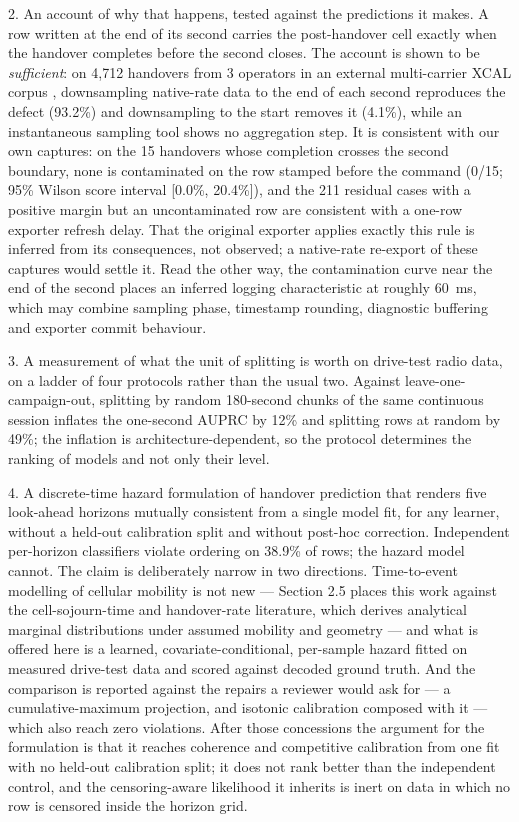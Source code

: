 2. An account of why that happens, tested against the predictions it makes. A row written at the end of its second carries the post-handover cell exactly when the handover completes before the second closes. The account is shown to be \emph{sufficient}: on 4,712 handovers from 3 operators in an external multi-carrier XCAL corpus \cite{ref40}, downsampling native-rate data to the end of each second reproduces the defect (93.2\%) and downsampling to the start removes it (4.1\%), while an instantaneous sampling tool \cite{ref37} shows no aggregation step. It is consistent with our own captures: on the 15 handovers whose completion crosses the second boundary, none is contaminated on the row stamped before the command (0/15; 95\% Wilson score interval [0.0\%, 20.4\%]), and the 211 residual cases with a positive margin but an uncontaminated row are consistent with a one-row exporter refresh delay. That the original exporter applies exactly this rule is inferred from its consequences, not observed; a native-rate re-export of these captures would settle it. Read the other way, the contamination curve near the end of the second places an inferred logging characteristic at roughly 60~ms, which may combine sampling phase, timestamp rounding, diagnostic buffering and exporter commit behaviour.

3. A measurement of what the unit of splitting is worth on drive-test radio data, on a ladder of four protocols rather than the usual two. Against leave-one-campaign-out, splitting by random 180-second chunks of the same continuous session inflates the one-second AUPRC by 12\% and splitting rows at random by 49\%; the inflation is architecture-dependent, so the protocol determines the ranking of models and not only their level.

4. A discrete-time hazard formulation of handover prediction that renders five look-ahead horizons mutually consistent from a single model fit, for any learner, without a held-out calibration split and without post-hoc correction. Independent per-horizon classifiers violate ordering on 38.9\% of rows; the hazard model cannot. The claim is deliberately narrow in two directions. Time-to-event modelling of cellular mobility is not new --- Section 2.5 places this work against the cell-sojourn-time and handover-rate literature, which derives analytical marginal distributions under assumed mobility and geometry --- and what is offered here is a learned, covariate-conditional, per-sample hazard fitted on measured drive-test data and scored against decoded ground truth. And the comparison is reported against the repairs a reviewer would ask for --- a cumulative-maximum projection, and isotonic calibration composed with it --- which also reach zero violations. After those concessions the argument for the formulation is that it reaches coherence and competitive calibration from one fit with no held-out calibration split; it does not rank better than the independent control, and the censoring-aware likelihood it inherits is inert on data in which no row is censored inside the horizon grid.

